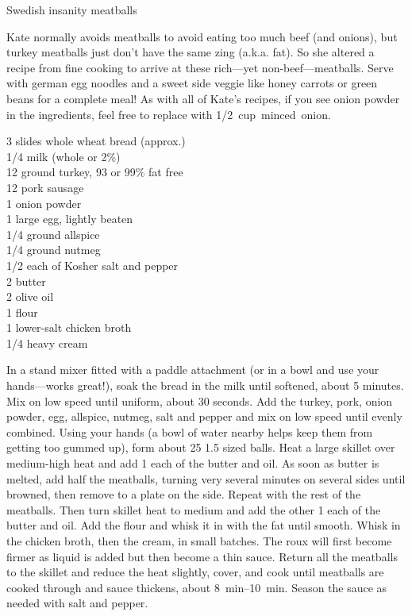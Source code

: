 \begin{entry}{Swedish insanity meatballs}

\begin{open}
  Kate normally avoids meatballs to avoid eating too much beef (and onions),
  but turkey meatballs just don't have the same zing (a.k.a. fat). So she
  altered a recipe from fine cooking to arrive at these rich---yet
  non-beef---meatballs. Serve with german egg noodles and a sweet side veggie
  like honey carrots or green beans for a complete meal! As with all of Kate's
  recipes, if you see onion powder in the ingredients, feel free to replace
  with \SI{1/2}cup minced onion.
\end{open}
\begin{ingredients}
    3 slides whole wheat bread (approx.)\\
    \SI{1/4}{\cup} milk (whole or 2\%) \\
    \SI{12}{\ounce} ground turkey, 93 or 99\% fat free\\
    \SI{12}{\ounce} pork sausage\\
    \SI{1}{\teaspoon} onion powder\\
    1 large egg, lightly beaten\\
    \SI{1/4}{\teaspoon} ground allspice\\
    \SI{1/4}{\teaspoon} ground nutmeg\\
    \SI{1/2}{\teaspoon} each of Kosher salt and pepper\\
    \SI{2}{\tblspoon} butter\\
    \SI{2}{\tblspoon} olive oil\\
    \SI{1}{\tblspoon} flour\\
    \SI{1}{\cup} lower-salt chicken broth\\
    \SI{1/4}{\cup} heavy cream
\end{ingredients}
In a stand mixer fitted with a paddle attachment (or in a bowl and use your
hands---works great!), soak the bread in the milk until softened, about 5
minutes. Mix on low speed until uniform, about 30 seconds. Add the turkey,
pork, onion powder, egg, allspice, nutmeg, salt and pepper and mix on low
speed until evenly combined. Using your hands (a bowl of water nearby helps
keep them from getting too gummed up), form about 25 \SI{1.5}{\inch} sized
balls. Heat a large skillet over medium-high heat and add \SI{1}{\tblspoon}
each of the butter and oil. As soon as butter is melted, add half the
meatballs, turning very several minutes on several sides until browned, then
remove to a plate on the side. Repeat with the rest of the meatballs. Then
turn skillet heat to medium and add the other \SI{1}{\tblspoon} each of the
butter and oil. Add the flour and whisk it in with the fat until smooth. Whisk
in the chicken broth, then the cream, in small batches. The roux will first
become firmer as liquid is added but then become a thin sauce. Return all the
meatballs to the skillet and reduce the heat slightly, cover, and cook until
meatballs are cooked through and sauce thickens, about
\SIrange{8}{10}{\minute}. Season the sauce as needed with salt and pepper.
\end{entry}

